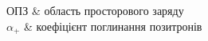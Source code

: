 \begin{longtabu}
  ОПЗ & область просторового заряду \\
$\alpha_+$ & коефіцієнт поглинання позитронів\\

\end{longtabu}
